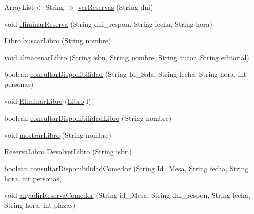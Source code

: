 \begin{DoxyCompactItemize}
Array\+List$<$ String $>$ \mbox{\hyperlink{classes_1_1deusto_1_1spq_1_1biblioteca_1_1controller_1_1_controller_aaf010f5a789f146044b4a68a55d8003b}{ver\+Reservas}} (String dni)
\item 
void \mbox{\hyperlink{classes_1_1deusto_1_1spq_1_1biblioteca_1_1controller_1_1_controller_a3cebd73d57780196c89d57dc70ea82d9}{eliminar\+Reserva}} (String dni\+\_\+respon, String fecha, String hora)
\item 
\mbox{\hyperlink{classes_1_1deusto_1_1spq_1_1biblioteca_1_1data_1_1_libro}{Libro}} \mbox{\hyperlink{classes_1_1deusto_1_1spq_1_1biblioteca_1_1controller_1_1_controller_ade06ace92b16c4316cf098e1cd848960}{buscar\+Libro}} (String nombre)
\item 
void \mbox{\hyperlink{classes_1_1deusto_1_1spq_1_1biblioteca_1_1controller_1_1_controller_a2e23b6eb05badf918991f4103918be6e}{almacenar\+Libro}} (String isbn, String nombre, String autor, String editorial)
\item 
boolean \mbox{\hyperlink{classes_1_1deusto_1_1spq_1_1biblioteca_1_1controller_1_1_controller_a8817268109280bd67ae41b802e650614}{consultar\+Disponibilidad}} (String Id\+\_\+\+Sala, String fecha, String hora, int personas)
\item 
void \mbox{\hyperlink{classes_1_1deusto_1_1spq_1_1biblioteca_1_1controller_1_1_controller_a1148ef899421a8639e6141ab695f9d01}{Eliminar\+Libro}} (\mbox{\hyperlink{classes_1_1deusto_1_1spq_1_1biblioteca_1_1data_1_1_libro}{Libro}} l)
\item 
boolean \mbox{\hyperlink{classes_1_1deusto_1_1spq_1_1biblioteca_1_1controller_1_1_controller_a45eb78b5f7d62253b68366a9fdb450e2}{consultar\+Disponibilidad\+Libro}} (String nombre)
\item 
void \mbox{\hyperlink{classes_1_1deusto_1_1spq_1_1biblioteca_1_1controller_1_1_controller_a180523dc3bcc8baf2ff083b1fec1505c}{mostrar\+Libro}} (String nombre)
\item 
\mbox{\hyperlink{classes_1_1deusto_1_1spq_1_1biblioteca_1_1data_1_1_reserva_libro}{Reserva\+Libro}} \mbox{\hyperlink{classes_1_1deusto_1_1spq_1_1biblioteca_1_1controller_1_1_controller_abe34befc3a9ab68e3686c9251b2c912e}{Devolver\+Libro}} (String isbn)
\item 
boolean \mbox{\hyperlink{classes_1_1deusto_1_1spq_1_1biblioteca_1_1controller_1_1_controller_a07dd1cd4ae156265973bbe1daa4c42e9}{consultar\+Disponibilidad\+Comedor}} (String Id\+\_\+\+Mesa, String fecha, String hora, int personas)
\item 
void \mbox{\hyperlink{classes_1_1deusto_1_1spq_1_1biblioteca_1_1controller_1_1_controller_a5c2097f9ae2be60cb00c6d408636feb3}{anyadir\+Reserva\+Comedor}} (String id\+\_\+\+Mesa, String dni\+\_\+respon, String fecha, String hora, int plazas)

\end{DoxyCompactItemize}
